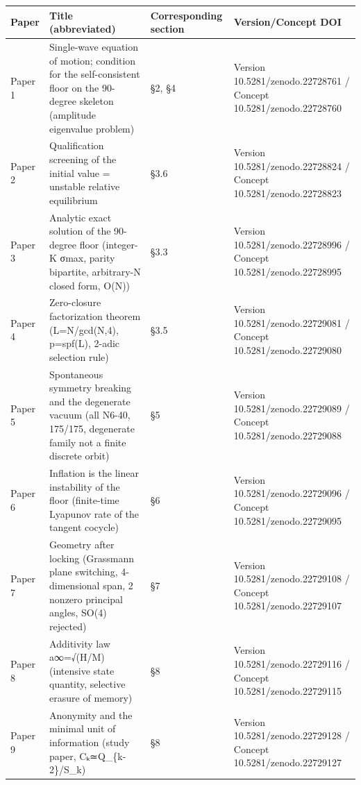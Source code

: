 \documentclass[
  a4paper,
]{ltjsarticle}
\newcounter{none} %
\begin{document}
{\def\LTcaptype{none} %
\begin{longtable}[]{@{}
  >{\raggedright\arraybackslash}p{}
  >{\raggedright\arraybackslash}p{}
  >{\raggedright\arraybackslash}p{}
  >{\raggedright\arraybackslash}p{}@{}}
\toprule\noalign{}
\begin{minipage}[b]{\linewidth}\raggedright
Paper
\end{minipage} & \begin{minipage}[b]{\linewidth}\raggedright
Title (abbreviated)
\end{minipage} & \begin{minipage}[b]{\linewidth}\raggedright
Corresponding section
\end{minipage} & \begin{minipage}[b]{\linewidth}\raggedright
Version/Concept DOI
\end{minipage} \\
\midrule\noalign{}
\endhead
\bottomrule\noalign{}
\endlastfoot
Paper 1 & Single-wave equation of motion; condition for the
self-consistent floor on the 90-degree skeleton (amplitude eigenvalue
problem) & §2, §4 & Version 10.5281/zenodo.22728761 / Concept
10.5281/zenodo.22728760 \\
Paper 2 & Qualification screening of the initial value = unstable
relative equilibrium & §3.6 & Version 10.5281/zenodo.22728824 / Concept
10.5281/zenodo.22728823 \\
Paper 3 & Analytic exact solution of the 90-degree floor (integer-K
σmax, parity bipartite, arbitrary-N closed form, O(N)) & §3.3 & Version
10.5281/zenodo.22728996 / Concept 10.5281/zenodo.22728995 \\
Paper 4 & Zero-closure factorization theorem (L=N/gcd(N,4), p=spf(L),
2-adic selection rule) & §3.5 & Version 10.5281/zenodo.22729081 /
Concept 10.5281/zenodo.22729080 \\
Paper 5 & Spontaneous symmetry breaking and the degenerate vacuum (all
N6-40, 175/175, degenerate family not a finite discrete orbit) & §5 &
Version 10.5281/zenodo.22729089 / Concept 10.5281/zenodo.22729088 \\
Paper 6 & Inflation is the linear instability of the floor (finite-time
Lyapunov rate of the tangent cocycle) & §6 & Version
10.5281/zenodo.22729096 / Concept 10.5281/zenodo.22729095 \\
Paper 7 & Geometry after locking (Grassmann plane switching,
4-dimensional span, 2 nonzero principal angles, SO(4) rejected) & §7 &
Version 10.5281/zenodo.22729108 / Concept 10.5281/zenodo.22729107 \\
Paper 8 & Additivity law a∞=√(H/M) (intensive state quantity, selective
erasure of memory) & §8 & Version 10.5281/zenodo.22729116 / Concept
10.5281/zenodo.22729115 \\
Paper 9 & Anonymity and the minimal unit of information (study paper,
Cₖ≃Q\_\{k-2\}/S\_k) & §8 & Version 10.5281/zenodo.22729128 / Concept
10.5281/zenodo.22729127 \\
\end{longtable}
}
\end{document}

